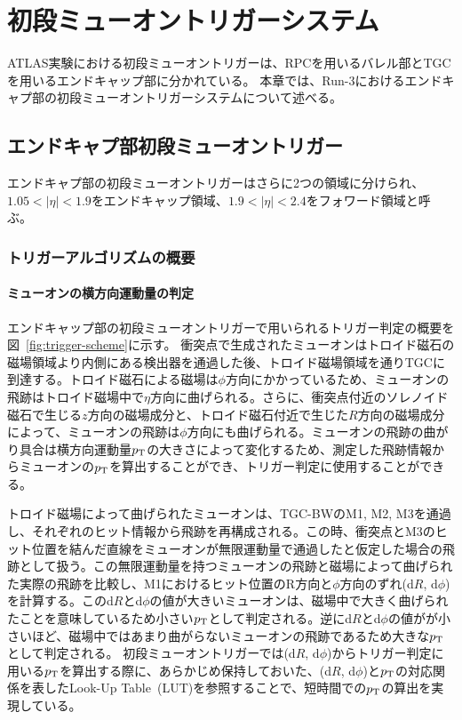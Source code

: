 \chapter{初段ミューオントリガーシステム}\label{chapter3}
ATLAS実験における初段ミューオントリガーは、RPCを用いるバレル部とTGCを用いるエンドキャップ部に分かれている。
本章では、Run-3におけるエンドキャプ部の初段ミューオントリガーシステムについて述べる。

\section{エンドキャプ部初段ミューオントリガー}
エンドキャプ部の初段ミューオントリガーはさらに2つの領域に分けられ、$1.05 < |\eta| < 1.9$をエンドキャップ領域、$1.9 < |\eta| < 2.4$をフォワード領域と呼ぶ。

\subsection{トリガーアルゴリズムの概要}\label{section:CW}

\subsubsection{ミューオンの横方向運動量の判定}
エンドキャップ部の初段ミューオントリガーで用いられるトリガー判定の概要を図~\ref{fig:trigger-scheme}に示す。
衝突点で生成されたミューオンはトロイド磁石の磁場領域より内側にある検出器を通過した後、トロイド磁場領域を通りTGCに到達する。トロイド磁石による磁場は$\phi$方向にかかっているため、ミューオンの飛跡はトロイド磁場中で$\eta$方向に曲げられる。さらに、衝突点付近のソレノイド磁石で生じる$z$方向の磁場成分と、トロイド磁石付近で生じた$R$方向の磁場成分によって、ミューオンの飛跡は$\phi$方向にも曲げられる。ミューオンの飛跡の曲がり具合は横方向運動量$p_{\rm{T}}$の大きさによって変化するため、測定した飛跡情報からミューオンの$p_{\rm{T}}$を算出することができ、トリガー判定に使用することができる。

トロイド磁場によって曲げられたミューオンは、TGC-BWのM1, M2, M3を通過し、それぞれのヒット情報から飛跡を再構成される。この時、衝突点とM3のヒット位置を結んだ直線をミューオンが無限運動量で通過したと仮定した場合の飛跡として扱う。この無限運動量を持つミューオンの飛跡と磁場によって曲げられた実際の飛跡を比較し、M1におけるヒット位置のR方向と$\phi$方向のずれ(d$R$, d$\phi$)を計算する。このd$R$とd$\phi$の値が大きいミューオンは、磁場中で大きく曲げられたことを意味しているため小さい$p_{\rm{T}}$として判定される。逆にd$R$とd$\phi$の値がが小さいほど、磁場中ではあまり曲がらないミューオンの飛跡であるため大きな$p_{\rm{T}}$として判定される。
初段ミューオントリガーでは(d$R$, d$\phi$)からトリガー判定に用いる$p_{\rm{T}}$を算出する際に、あらかじめ保持しておいた、(d$R$, d$\phi$)と$p_{\rm{T}}$の対応関係を表したLook-Up Table~(LUT)を参照することで、短時間での$p_{\rm{T}}$の算出を実現している。

